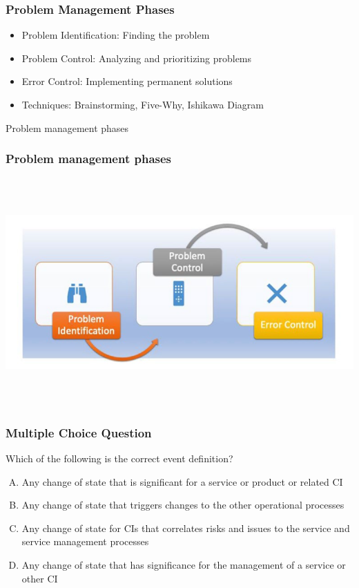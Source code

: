 \documentclass[aspectratio=169, table]{beamer}
\begin{document}
\begin{frame}
	\frametitle{Problem Management Phases}
	\begin{itemize}
		\item Problem Identification: Finding the problem
		\item Problem Control: Analyzing and prioritizing problems
		\item Error Control: Implementing permanent solutions
		\item Techniques: Brainstorming, Five-Why, Ishikawa Diagram
	\end{itemize}
\end{frame}

\begin{frame}{Problem management phases} 	 \frametitle{ Problem management phases} \begin{center} 	\includegraphics[width=0.8\linewidth]{images/image-04.png} \end{center} \end{frame}

\begin{frame}
	\frametitle{Multiple Choice Question}
	
	Which of the following is the correct event definition?
	\begin{enumerate}[A.]
		\item Any change of state that is significant for a service or product or related CI
		\item Any change of state that triggers changes to the other operational processes
		\item Any change of state for CIs that correlates risks and issues to the service and service management processes
		\item Any change of state that has significance for the management of a service or other CI
	\end{enumerate}
	
\end{frame}
\end{document}
